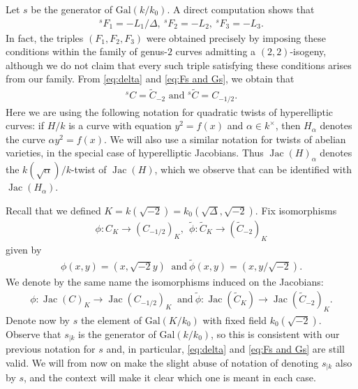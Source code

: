 \documentclass[oneside]{amsart}
\theoremstyle{remark}
\newcommand{\lra}{\longrightarrow}
\newcommand{\Gal}{\mathrm{Gal}}
\newcommand{\Jac}{\operatorname{Jac}}
\numberwithin{equation}{section}
\begin{document}
Let ${s}$ be the generator of $\Gal(k/k_0)$. A direct computation shows that
\begin{align}\label{eq:Fs and Gs}
  {}^{s} F_1 = -  L_1 /\Delta,\   {}^{s} F_2 = - L_2 ,\ 
  {}^{s} F_3 = - L_3.
\end{align}
In fact, the triples $(F_1,F_2,F_3)$ were obtained precisely by imposing these conditions within the family of genus-$2$ curves admitting a $(2,2)$-isogeny, although we do not claim that every such triple satisfying these conditions arises from our family.  From \eqref{eq:delta} and \eqref{eq:Fs and Gs}, we obtain that
\begin{align}\label{eq: C and C sigma}
  {{}^{s} C } = \tilde C_{-2} \text{ and } {{}^{s} \tilde  C} = C_{-1/2}.
\end{align}
Here we are using the following notation for quadratic twists of hyperelliptic curves: if $H/k$ is a curve with equation $y^2 = f(x)$ and $\alpha\in k^\times$, then $H_\alpha$ denotes the curve $\alpha y^2 = f(x)$. We will also use a similar notation for twists of abelian varieties, in the special case of hyperelliptic Jacobians. Thus $\Jac(H)_\alpha$ denotes the $k(\sqrt{\alpha})/k$-twist of $\Jac(H)$, which we observe that can be identified with $\Jac(H_\alpha)$.

Recall that we defined $K = k(\sqrt{-2}) =k_0(\sqrt{\Delta},\sqrt{-2})$. Fix isomorphisms
\begin{align*}
\phi\colon C_{K} \lra (C_{-1/2})_{K},\  \   \tilde\phi\colon \tilde{C}_{K} \lra (\tilde{C}_{-2})_{K}
\end{align*}
given by
\begin{align}
  \label{eq:phiandphitilde}
\phi(x,y)=(x,\sqrt{-2}y) \ \text{ and} \ \tilde\phi(x,y)=(x,y/\sqrt{-2}).  
\end{align}
 We denote by the same name the isomorphisms induced on the Jacobians:
\begin{align*}
\phi\colon \Jac(C)_{K} \lra \Jac(C_{-1/2})_{K} \ \text{ and} \    \tilde\phi\colon\Jac (\tilde{C}_{K}) \lra \Jac(\tilde{C}_{-2})_{K}.
\end{align*}
Denote now by ${s}$ the element of $\Gal(K/k_0)$ with fixed field $k_0(\sqrt{-2})$. Observe that ${s}_{|k}$ is the generator of $\Gal(k/k_0)$, so this is consistent with our previous notation for ${s}$ and, in particular,  \eqref{eq:delta} and \eqref{eq:Fs and Gs} are still valid. We will from now on make the slight abuse of notation of denoting ${s}_{|k}$ also by ${s}$, and the context will make it clear which one is meant in each case.
\end{document}
